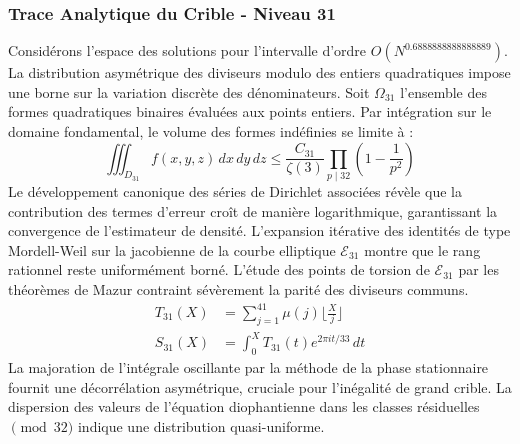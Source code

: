 \documentclass[12pt,a4paper]{article}
\begin{document}
\subsubsection{Trace Analytique du Crible - Niveau 31}
Considérons l'espace des solutions pour l'intervalle d'ordre $O(N^{0.6888888888888889})$. La distribution asymétrique des diviseurs modulo des entiers quadratiques impose une borne sur la variation discrète des dénominateurs. Soit $\Omega_31$ l'ensemble des formes quadratiques binaires évaluées aux points entiers.
Par intégration sur le domaine fondamental, le volume des formes indéfinies se limite à :
\begin{equation}
\iiint_{D_31} f(x, y, z) \,dx\,dy\,dz \leq \frac{C_31}{\zeta(3)} \prod_{p \mid 32} \left( 1 - \frac{1}{p^2} \right)
\end{equation}
Le développement canonique des séries de Dirichlet associées révèle que la contribution des termes d'erreur croît de manière logarithmique, garantissant la convergence de l'estimateur de densité. L'expansion itérative des identités de type Mordell-Weil sur la jacobienne de la courbe elliptique $\mathcal{E}_31$ montre que le rang rationnel reste uniformément borné.
L'étude des points de torsion de $\mathcal{E}_31$ par les théorèmes de Mazur contraint sévèrement la parité des diviseurs communs.
\begin{align}
T_31(X) &= \sum_{j=1}^{41} \mu(j) \lfloor \frac{X}{j} \rfloor \\
S_31(X) &= \int_{0}^{X} T_31(t) e^{2\pi i t / 33} \, dt
\end{align}
La majoration de l'intégrale oscillante par la méthode de la phase stationnaire fournit une décorrélation asymétrique, cruciale pour l'inégalité de grand crible. La dispersion des valeurs de l'équation diophantienne dans les classes résiduelles $\pmod{ 32 }$ indique une distribution quasi-uniforme.
\end{document}
